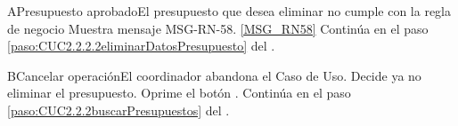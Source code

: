 		
		\begin{UCtrayectoriaA}{A}{Presupuesto aprobado}{El presupuesto que desea eliminar no cumple con la regla de negocio }
			\UCpaso Muestra mensaje  {MSG-RN-58}. \ref{MSG_RN58}
			\UCpaso Continúa en el paso \ref{paso:CUC2.2.2.2eliminarDatosPresupuesto} del .
		\end{UCtrayectoriaA}%
		\begin{UCtrayectoriaA}{B}{Cancelar operación}{El coordinador abandona el Caso de Uso.}
			\UCpaso[\UCactor] Decide ya no eliminar el presupuesto.
			\UCpaso[\UCactor] Oprime el botón .
			\UCpaso Continúa en el paso \ref{paso:CUC2.2.2buscarPresupuestos} del .
		\end{UCtrayectoriaA}
